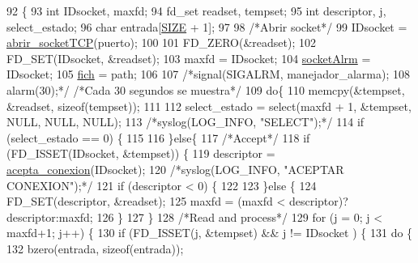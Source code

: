 \begin{DoxyCode}
92                                      \{
93         \textcolor{keywordtype}{int} IDsocket, maxfd;
94         fd\_set readset, tempset;
95         \textcolor{keywordtype}{int} descriptor, j, select\_estado;
96         \textcolor{keywordtype}{char} entrada[\hyperlink{_g-2361-06-_p1-_server_8h_a70ed59adcb4159ac551058053e649640}{SIZE} + 1];     
97 
98         \textcolor{comment}{/*Abrir socket*/}
99         IDsocket = \hyperlink{_g-2361-06-_p1-_sockets_8h_af2f55f83053c8fdebb8da511cd65880c}{abrir\_socketTCP}(puerto);
100 
101         FD\_ZERO(&readset);
102         FD\_SET(IDsocket, &readset);
103         maxfd = IDsocket;
104         \hyperlink{_g-2361-06-_p1-_server_8c_a882bc4c5a2b02dd85d4716961c4d902f}{socketAlrm} = IDsocket;
105         \hyperlink{_g-2361-06-_p1-_server_8c_a5666511ca3d4a3dc685c6f14c663aed5}{fich} = path;
106 
107         \textcolor{comment}{/*signal(SIGALRM, manejador\_alarma);}
108 \textcolor{comment}{        alarm(30);*/} \textcolor{comment}{/*Cada 30 segundos se muestra*/}
109         \textcolor{keywordflow}{do}\{
110                 memcpy(&tempset, &readset, \textcolor{keyword}{sizeof}(tempset));
111           
112                 select\_estado = select(maxfd + 1, &tempset, NULL, NULL, NULL);
113                 \textcolor{comment}{/*syslog(LOG\_INFO, "SELECT");*/}
114                 \textcolor{keywordflow}{if} (select\_estado == 0) \{
115                         
116                 \}\textcolor{keywordflow}{else}\{
117                         \textcolor{comment}{/*Accept*/}
118                         \textcolor{keywordflow}{if} (FD\_ISSET(IDsocket, &tempset)) \{
119                          descriptor = \hyperlink{_g-2361-06-_p1-_sockets_8h_a172e85f036cff044fd5ba218460115c7}{acepta\_conexion}(IDsocket);
120                          \textcolor{comment}{/*syslog(LOG\_INFO, "ACEPTAR CONEXION");*/}
121                          \textcolor{keywordflow}{if} (descriptor < 0) \{
122 
123                          \}\textcolor{keywordflow}{else} \{
124                             FD\_SET(descriptor, &readset);
125                             maxfd = (maxfd < descriptor)?descriptor:maxfd;
126                          \}
127                 \}
128                 \textcolor{comment}{/*Read and process*/}
129                 \textcolor{keywordflow}{for} (j = 0; j < maxfd+1; j++) \{
130                         \textcolor{keywordflow}{if} (FD\_ISSET(j, &tempset) && j != IDsocket ) \{
131                             \textcolor{keywordflow}{do} \{
132                                bzero(entrada, \textcolor{keyword}{sizeof}(entrada));

\end{DoxyCode}
